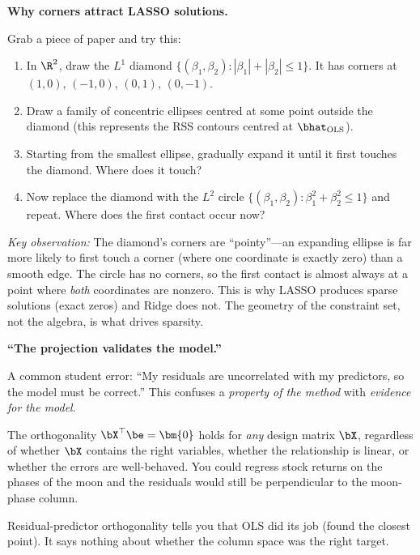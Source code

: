 \begin{stopandthink}
\textbf{Why corners attract LASSO solutions.}

Grab a piece of paper and try this:
\begin{enumerate}[nosep]
  \item In $\R^2$, draw the $L^1$ diamond
        $\{(\beta_1, \beta_2) : |\beta_1| + |\beta_2| \le 1\}$.
        It has corners at $(1,0)$, $(-1,0)$, $(0,1)$, $(0,-1)$.
  \item Draw a family of concentric ellipses centred at some point
        outside the diamond (this represents the RSS contours centred
        at $\bhat_{\text{OLS}}$).
  \item Starting from the smallest ellipse, gradually expand it until
        it first touches the diamond. Where does it touch?
  \item Now replace the diamond with the $L^2$ circle
        $\{(\beta_1, \beta_2) : \beta_1^2 + \beta_2^2 \le 1\}$
        and repeat. Where does the first contact occur now?
\end{enumerate}
\emph{Key observation:}
The diamond's corners are ``pointy''---an expanding ellipse is far more
likely to first touch a corner (where one coordinate is exactly zero)
than a smooth edge.
The circle has no corners, so the first contact is almost always at a
point where \emph{both} coordinates are nonzero.
This is why LASSO produces sparse solutions (exact zeros) and Ridge does not.
The geometry of the constraint set, not the algebra, is what drives sparsity.
\end{stopandthink}




\begin{misconception}
\textbf{``The projection validates the model.''}

A common student error: ``My residuals are uncorrelated with my
predictors, so the model must be correct.'' This confuses a
\emph{property of the method} with \emph{evidence for the model}.

The orthogonality $\bX^\top \be = \bm{0}$ holds for \emph{any}
design matrix $\bX$, regardless of whether $\bX$ contains the
right variables, whether the relationship is linear, or whether
the errors are well-behaved. You could regress stock returns on
the phases of the moon and the residuals would still be
perpendicular to the moon-phase column.

Residual-predictor orthogonality tells you that OLS did its job
(found the closest point). It says nothing about whether the
column space was the right target.
\end{misconception}


